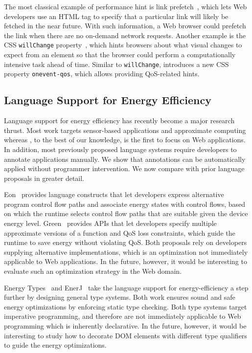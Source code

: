 The most classical example of performance hint is link prefetch~\cite{linkprefetch}, which lets Web developers use an HTML tag to specify that a particular link will likely be fetched in the near future. With such information, a Web browser could prefetch the link when there are no on-demand network requests. Another example is the CSS \texttt{willChange} property~\cite{csswillchange}, which hints browsers about what visual changes to expect from an element so that the browser could perform a computationally intensive task ahead of time. Similar to \texttt{willChange}, \greenweb introduces a new CSS property \texttt{onevent-qos}, which allows providing QoS-related hints.

\subsection{Language Support for Energy Efficiency}
\label{sec:lang:related:energy}

Language support for energy efficiency has recently become a major research thrust. Most work targets sensor-based applications and approximate computing whereas \greenweb, to the best of our knowledge, is the first to focus on Web applications. In addition, most previously proposed language systems require developers to annotate applications manually. We show that \greenweb annotations can be automatically applied without programmer intervention. We now compare \greenweb with prior language proposals in greater detail.

Eon~\cite{eon} provides language constructs that let developers express alternative program control flow paths and associate energy states with control flows, based on which the runtime selects control flow paths that are suitable given the device energy level. Green~\cite{green} provides APIs that let developers specify multiple approximate versions of a function and QoS loss constraints, which guide the runtime to save energy without violating QoS. Both proposals rely on developers supplying alternative implementations, which is an optimization not immediately applicable to Web applications. In the future, however, it would be interesting to evaluate such an optimization strategy in the Web domain.

Energy Types~\cite{energytypes} and EnerJ~\cite{enerJ} take the language support for energy-efficiency a step further by designing general type systems. Both work ensures sound and safe energy optimizations by enforcing static type checking. Both type systems target imperative programming, and therefore are not immediately applicable to Web programming which is inherently declarative. In the future, however, it would be interesting to study how to decorate DOM elements with different type qualifiers to guide the energy optimizations.

